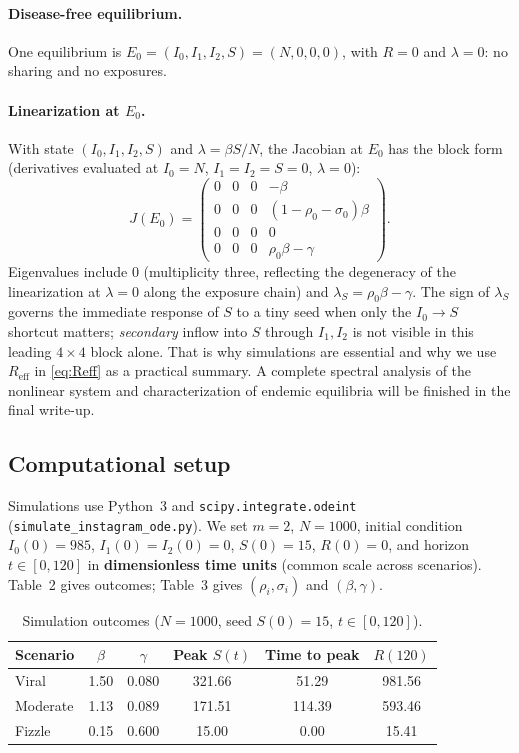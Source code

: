 \documentclass[11pt]{article}
\begin{document}
\paragraph{Disease-free equilibrium.} One equilibrium is $E_0=(I_0,I_1,I_2,S)=(N,0,0,0)$, with $R=0$ and $\lambda=0$: no sharing and no exposures.

\paragraph{Linearization at $E_0$.} With state $(I_0,I_1,I_2,S)$ and $\lambda=\beta S/N$, the Jacobian at $E_0$ has the block form (derivatives evaluated at $I_0=N$, $I_1=I_2=S=0$, $\lambda=0$):
\[
J(E_0)=
\begin{pmatrix}
0 & 0 & 0 & -\beta \\
0 & 0 & 0 & (1-\rho_0-\sigma_0)\beta \\
0 & 0 & 0 & 0 \\
0 & 0 & 0 & \rho_0\beta-\gamma
\end{pmatrix}.
\]
Eigenvalues include $0$ (multiplicity three, reflecting the degeneracy of the linearization at $\lambda=0$ along the exposure chain) and $\lambda_S=\rho_0\beta-\gamma$. The sign of $\lambda_S$ governs the immediate response of $S$ to a tiny seed when only the $I_0\to S$ shortcut matters; \emph{secondary} inflow into $S$ through $I_1,I_2$ is not visible in this leading $4\times 4$ block alone. That is why simulations are essential and why we use $R_{\mathrm{eff}}$ in \eqref{eq:Reff} as a practical summary. A complete spectral analysis of the nonlinear system and characterization of endemic equilibria will be finished in the final write-up.

\subsection{Computational setup}

Simulations use Python~3 and \texttt{scipy.integrate.odeint} (\texttt{simulate\_instagram\_ode.py}). We set $m=2$, $N=1000$, initial condition $I_0(0)=985$, $I_1(0)=I_2(0)=0$, $S(0)=15$, $R(0)=0$, and horizon $t\in[0,120]$ in \textbf{dimensionless time units} (common scale across scenarios). Table~2 gives outcomes; Table~3 gives $(\rho_i,\sigma_i)$ and $(\beta,\gamma)$.

\begin{table}[h]
\centering
\caption{Simulation outcomes ($N=1000$, seed $S(0)=15$, $t\in[0,120]$).}
\begin{tabular}{|l|c|c|c|c|c|}
\hline
\textbf{Scenario} & $\beta$ & $\gamma$ & \textbf{Peak $S(t)$} & \textbf{Time to peak} & \textbf{$R(120)$} \\
\hline
Viral & 1.50 & 0.080 & 321.66 & 51.29 & 981.56 \\
Moderate & 1.13 & 0.089 & 171.51 & 114.39 & 593.46 \\
Fizzle & 0.15 & 0.600 & 15.00 & 0.00 & 15.41 \\
\hline
\end{tabular}
\end{table}
\end{document}
